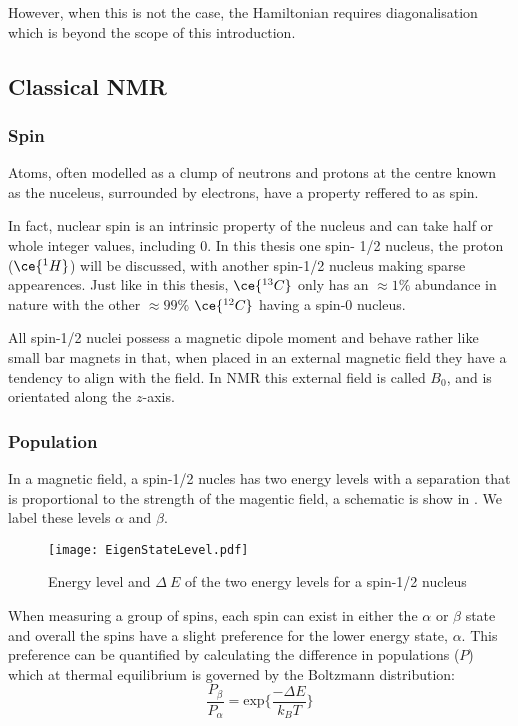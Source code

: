 However, when this is not the case, the Hamiltonian requires diagonalisation which is beyond the scope of this introduction.

\subsection{Classical NMR}

\subsubsection{Spin}

Atoms, often modelled as a clump of neutrons and protons at
the centre known as the nuceleus, surrounded by electrons, have a property reffered to as spin.

In fact, nuclear spin is an intrinsic property of the nucleus and can take half or whole
integer values, including $0$. In this thesis one spin- 1/2 nucleus, the proton ($\ce{^{1}H}$) will be discussed, with another spin-1/2 nucleus  making
sparse appearences. Just like in this thesis, $\ce{^{13}C}$ only has an $\approx{1}\%$
abundance in nature with the other $\approx{99}\%$ $\ce{^{12}C}$ having a spin-$0$
nucleus.

All spin-1/2 nuclei possess a magnetic dipole moment and behave rather like small bar magnets in that, when placed in an external magnetic field they have a tendency to align
with the field. In NMR this external field is called $B_0$, and is orientated along the
$z$-axis.

\subsubsection{Population}\label{Population}

In a magnetic field, a spin-1/2 nucles has two energy levels with a separation that is proportional to the strength of the magentic field, a schematic is show in . We label these levels $\alpha$ and $\beta$.

\begin{figure}
  \begin{center}
  \texttt{[image: EigenStateLevel.pdf]}
  \end{center}
  \caption{Energy level and $\Delta~E$ of the two energy levels for a spin-1/2 nucleus}
  \label{fig:EnergySplit}
\end{figure}

When measuring a group of spins, each spin can exist in either the $\alpha$ or $\beta$ state and overall
the spins have a slight preference for the lower energy state, $\alpha$. This preference can be quantified
by calculating the difference in populations ($P$) which at thermal equilibrium is governed by the
Boltzmann distribution:
\begin{equation}\label{eqn:Boltzmann}
  \frac{P_{\beta}}{P_{\alpha}} = \text{exp}\{\frac{-\Delta{E}}{k_B T}\}
\end{equation}

